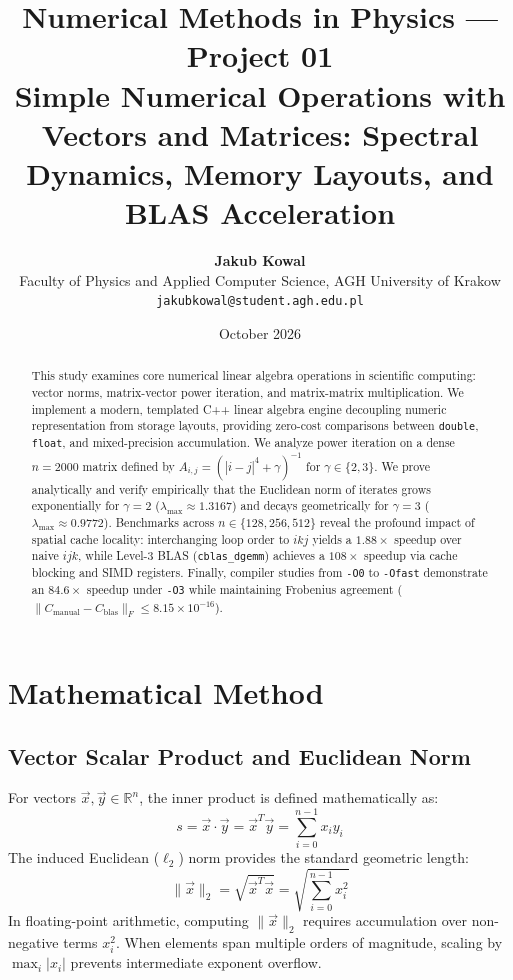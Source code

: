 \documentclass[11pt,a4paper]{article}
\title{\vspace{-0.6cm}\textbf{Numerical Methods in Physics --- Project 01}\\
\large Simple Numerical Operations with Vectors and Matrices: Spectral Dynamics, Memory Layouts, and BLAS Acceleration}
\author{\textbf{Jakub Kowal}\\
Faculty of Physics and Applied Computer Science, AGH University of Krakow\\
\texttt{jakubkowal@student.agh.edu.pl}}
\date{October 2026}
\begin{document}
\maketitle
\vspace{-0.4cm}

\begin{abstract}
\noindent This study examines core numerical linear algebra operations in scientific computing: vector norms, matrix-vector power iteration, and matrix-matrix multiplication. We implement a modern, templated C++ linear algebra engine decoupling numeric representation from storage layouts, providing zero-cost comparisons between \texttt{double}, \texttt{float}, and mixed-precision accumulation. We analyze power iteration on a dense $n=2000$ matrix defined by $A_{i,j} = (|i-j|^4 + \gamma)^{-1}$ for $\gamma \in \{2, 3\}$. We prove analytically and verify empirically that the Euclidean norm of iterates grows exponentially for $\gamma=2$ ($\lambda_{\max} \approx 1.3167$) and decays geometrically for $\gamma=3$ ($\lambda_{\max} \approx 0.9772$). Benchmarks across $n \in \{128, 256, 512\}$ reveal the profound impact of spatial cache locality: interchanging loop order to $ikj$ yields a $1.88\times$ speedup over naive $ijk$, while Level-3 BLAS (\texttt{cblas\_dgemm}) achieves a $108\times$ speedup via cache blocking and SIMD registers. Finally, compiler studies from \texttt{-O0} to \texttt{-Ofast} demonstrate an $84.6\times$ speedup under \texttt{-O3} while maintaining Frobenius agreement ($\|C_{\text{manual}} - C_{\text{blas}}\|_F \le 8.15 \times 10^{-16}$).
\end{abstract}

\section{Mathematical Method}

\subsection{Vector Scalar Product and Euclidean Norm}
For vectors $\vec{x}, \vec{y} \in \mathbb{R}^n$, the inner product is defined mathematically as:
\begin{equation}
s = \vec{x} \cdot \vec{y} = \vec{x}^T \vec{y} = \sum_{i=0}^{n-1} x_i y_i
\end{equation}
The induced Euclidean ($\ell_2$) norm provides the standard geometric length:
\begin{equation}
\|\vec{x}\|_2 = \sqrt{\vec{x}^T \vec{x}} = \sqrt{\sum_{i=0}^{n-1} x_i^2}
\end{equation}
In floating-point arithmetic, computing $\|\vec{x}\|_2$ requires accumulation over non-negative terms $x_i^2$. When elements span multiple orders of magnitude, scaling by $\max_i |x_i|$ prevents intermediate exponent overflow.
\end{document}
